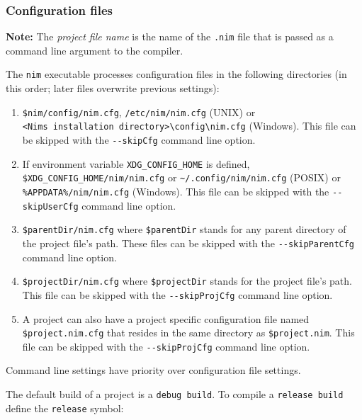 \hypertarget{configuration-files}{%
\subsubsection{Configuration files}\label{configuration-files}}

\textbf{Note:} The \emph{project file name} is the name of the
\texttt{.nim} file that is passed as a command line argument to the
compiler.

The \texttt{nim} executable processes configuration files in the
following directories (in this order; later files overwrite previous
settings):

\begin{enumerate}
\def\labelenumi{\arabic{enumi})}
\tightlist
\item
  \texttt{\$nim/config/nim.cfg}, \texttt{/etc/nim/nim.cfg} (UNIX) or
  \texttt{\textless{}Nim\textquotesingle{}s\ installation\ directory\textgreater{}\textbackslash{}config\textbackslash{}nim.cfg}
  (Windows). This file can be skipped with the \texttt{-\/-skipCfg}
  command line option.
\item
  If environment variable \texttt{XDG\_CONFIG\_HOME} is defined,
  \texttt{\$XDG\_CONFIG\_HOME/nim/nim.cfg} or
  \texttt{\textasciitilde{}/.config/nim/nim.cfg} (POSIX) or
  \texttt{\%APPDATA\%/nim/nim.cfg} (Windows). This file can be skipped
  with the \texttt{-\/-skipUserCfg} command line option.
\item
  \texttt{\$parentDir/nim.cfg} where \texttt{\$parentDir} stands for any
  parent directory of the project file's path. These files can be
  skipped with the \texttt{-\/-skipParentCfg} command line option.
\item
  \texttt{\$projectDir/nim.cfg} where \texttt{\$projectDir} stands for
  the project file's path. This file can be skipped with the
  \texttt{-\/-skipProjCfg} command line option.
\item
  A project can also have a project specific configuration file named
  \texttt{\$project.nim.cfg} that resides in the same directory as
  \texttt{\$project.nim}. This file can be skipped with the
  \texttt{-\/-skipProjCfg} command line option.
\end{enumerate}

Command line settings have priority over configuration file settings.

The default build of a project is a \texttt{debug\ build}. To compile a
\texttt{release\ build} define the \texttt{release} symbol:

